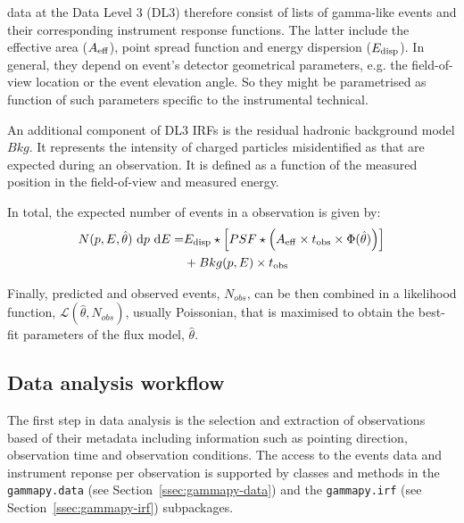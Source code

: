 \documentclass[traditabstract, longauth]{aa}
\newcommand{\code}[1]{\texttt{#1}}
\begin{document}
\gammaray data at the Data Level 3 (DL3) therefore consist of lists of gamma-like events and their
corresponding instrument response functions. The latter include the effective area ($A_{\rm eff}$),
point spread function and energy dispersion ($E_{\rm disp}$).
In general, they depend on event's detector
geometrical parameters, e.g. the field-of-view location or the event elevation angle. So they might be parametrised as
function of such parameters specific to the instrumental technical.


An additional component of DL3 IRFs is the residual hadronic background model $Bkg$.
It represents the intensity of charged particles misidentified as \gammarays that are expected
during an observation. It is defined as a function of the measured position in the field-of-view
and measured energy.

In total, the expected number of events in a \gammaray observation is given by:
\begin{equation}
	\begin{split}
  N(p, E, \hat{\theta})\ {\rm d}p\ {\rm d}E =  &E_{\rm disp} \star \left[ PSF \star \left( A_{\rm eff} \times t_{\rm obs} \times \Phi(\hat{\theta}) \right) \right]\\
                       & + Bkg(p, E) \times t_{\rm obs}
	\end{split}
\end{equation}
				

Finally, predicted and observed events, $N_{obs}$, can be then combined in a likelihood function,
$\mathcal{L}(\hat{\theta}, N_{obs})$, usually Poissonian, that is maximised to obtain the best-fit parameters of the flux model, $\hat{\theta}$.

\subsection{Data analysis workflow}
The first step in \gammaray data analysis is the selection and extraction of observations
based of their metadata including information such as pointing direction, observation
time and observation conditions. The access to the events data and instrument 
reponse per observation is supported by classes and methods
in the \code{gammapy.data} (see Section~\ref{ssec:gammapy-data}) and the \code{gammapy.irf}
(see Section~\ref{ssec:gammapy-irf}) subpackages.
\end{document}
